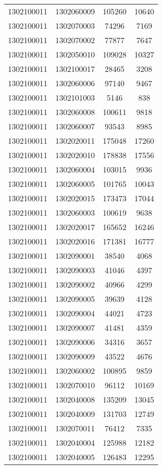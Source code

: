 \begin{longtable}[h]{llcc}
		1302100011 & 1302060009 & 105260 & 10640\\
		1302100011 & 1302070003 & 74296 & 7169\\
		1302100011 & 1302070002 & 77877 & 7647\\
		1302100011 & 1302050010 & 109028 & 10327\\
		1302100011 & 1302100017 & 28465 & 3208\\
		1302100011 & 1302060006 & 97140 & 9467\\
		1302100011 & 1302101003 & 5146 & 838\\
		1302100011 & 1302060008 & 100611 & 9818\\
		1302100011 & 1302060007 & 93543 & 8985\\
		1302100011 & 1302020011 & 175048 & 17260\\
		1302100011 & 1302020010 & 178838 & 17556\\
		1302100011 & 1302060004 & 103015 & 9936\\
		1302100011 & 1302060005 & 101765 & 10043\\
		1302100011 & 1302020015 & 173473 & 17044\\
		1302100011 & 1302060003 & 100619 & 9638\\
		1302100011 & 1302020017 & 165652 & 16246\\
		1302100011 & 1302020016 & 171381 & 16777\\
		1302100011 & 1302090001 & 38540 & 4068\\
		1302100011 & 1302090003 & 41046 & 4397\\
		1302100011 & 1302090002 & 40966 & 4299\\
		1302100011 & 1302090005 & 39639 & 4128\\
		1302100011 & 1302090004 & 44021 & 4723\\
		1302100011 & 1302090007 & 41481 & 4359\\
		1302100011 & 1302090006 & 34316 & 3657\\
		1302100011 & 1302090009 & 43522 & 4676\\
		1302100011 & 1302060002 & 100895 & 9859\\
		1302100011 & 1302070010 & 96112 & 10169\\
		1302100011 & 1302040008 & 135209 & 13045\\
		1302100011 & 1302040009 & 131703 & 12749\\
		1302100011 & 1302070011 & 76412 & 7335\\
		1302100011 & 1302040004 & 125988 & 12182\\
		1302100011 & 1302040005 & 126483 & 12295\\

\end{longtable}
